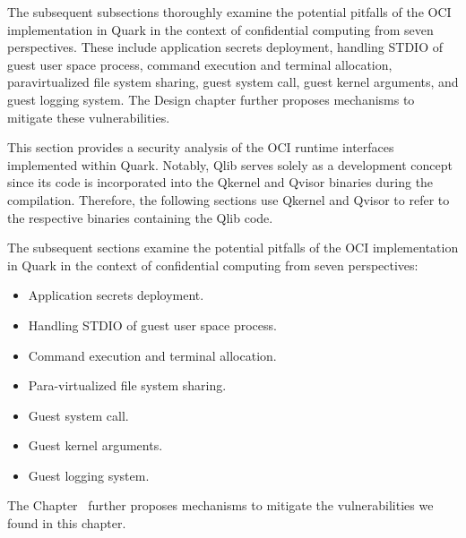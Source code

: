 The subsequent subsections thoroughly examine the potential pitfalls of the OCI implementation in Quark in the context of confidential computing from seven perspectives. These include application secrets deployment, handling  STDIO of guest user 
space process, command execution and terminal allocation, paravirtualized file system sharing, guest system call,  guest kernel arguments, and guest logging system. The Design chapter further proposes mechanisms to mitigate these vulnerabilities.


This section provides a security analysis of the OCI runtime interfaces~\cite*{oci-runtime-spec} implemented within Quark. Notably, Qlib serves solely as a development concept since its code is incorporated into the Qkernel and Qvisor binaries 
during the compilation. Therefore, the following sections use Qkernel and Qvisor to refer to the respective binaries containing the Qlib code.

The subsequent sections examine the potential pitfalls of the OCI implementation in Quark in the context of confidential computing from seven perspectives:

\begin{itemize}
  \item Application secrets deployment.
  \item Handling STDIO of guest user space process.
  \item Command execution and terminal allocation.
  \item Para-virtualized file system sharing.
  \item Guest system call.
  \item Guest kernel arguments.
  \item Guest logging system. 
\end{itemize}

The Chapter~\cite*{sec:design} further proposes mechanisms to mitigate the vulnerabilities we found in this chapter.


